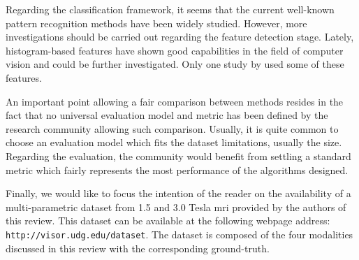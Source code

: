 Regarding the classification framework, it seems that the current well-known pattern recognition methods have been widely studied. However, more investigations should be carried out regarding the feature detection stage. Lately, histogram-based features have shown good capabilities in the field of computer vision and could be further investigated. Only one study by \cite{Liu2013} used some of these features.

An important point allowing a fair comparison between methods resides in the fact that no universal evaluation model and metric has been defined by the research community allowing such comparison. Usually, it is quite common to choose an evaluation model which fits the dataset limitations, usually the size. Regarding the evaluation, the community would benefit from settling a standard metric which fairly represents the most performance of the algorithms designed.

Finally, we would like to focus the intention of the reader on the availability of a multi-parametric dataset from 1.5 and 3.0 Tesla \ac{mri} provided by the authors of this review. This dataset can be available at the following webpage address: \texttt{http://visor.udg.edu/dataset}. The dataset is composed of the four modalities discussed in this review with the corresponding ground-truth.